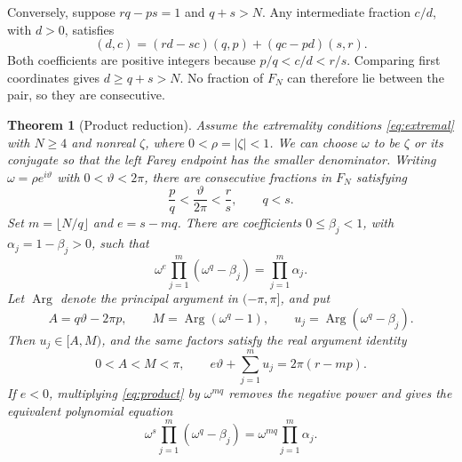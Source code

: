 \documentclass[11pt,a4paper]{article}
\DeclareMathOperator{\Arg}{Arg}
\newtheorem{theorem}{Theorem}[section]
\theoremstyle{definition}
\theoremstyle{remark}
\numberwithin{equation}{section}
\begin{document}
Conversely, suppose $rq-ps=1$ and $q+s>N$. Any intermediate fraction $c/d$, with $d>0$, satisfies
\[
 (d,c)=(rd-sc)(q,p)+(qc-pd)(s,r).
\]
Both coefficients are positive integers because $p/q<c/d<r/s$. Comparing first coordinates gives $d\ge q+s>N$. No fraction of $F_N$ can therefore lie between the pair, so they are consecutive.

\begin{theorem}[Product reduction]\label{thm:product}
Assume the extremality conditions \eqref{eq:extremal} with $N\ge4$ and nonreal $\zeta$, where $0<\rho=|\zeta|<1$. We can choose $\omega$ to be $\zeta$ or its conjugate so that the left Farey endpoint has the smaller denominator. Writing $\omega=\rho e^{i\vartheta}$ with $0<\vartheta<2\pi$, there are consecutive fractions in $F_N$ satisfying
\[
 \frac pq<\frac{\vartheta}{2\pi}<\frac rs,\qquad q<s.
\]
Set $m=\lfloor N/q\rfloor$ and $e=s-mq$. There are coefficients $0\le\beta_j<1$, with $\alpha_j=1-\beta_j>0$, such that
\begin{equation}\label{eq:product}
 \omega^e\prod_{j=1}^m(\omega^q-\beta_j)=\prod_{j=1}^m\alpha_j.
\end{equation}
Let $\Arg$ denote the principal argument in $(-\pi,\pi]$, and put
\[
 A=q\vartheta-2\pi p,\qquad M=\Arg(\omega^q-1),
 \qquad u_j=\Arg(\omega^q-\beta_j).
\]
Then $u_j\in[A,M)$, and the same factors satisfy the real argument identity
\begin{equation}\label{eq:product-phase}
 0<A<M<\pi,\qquad
 e\vartheta+\sum_{j=1}^m u_j=2\pi(r-mp).
\end{equation}
If $e<0$, multiplying \eqref{eq:product} by $\omega^{mq}$ removes the negative power and gives the equivalent polynomial equation
\[
 \omega^s\prod_{j=1}^m(\omega^q-\beta_j)
       =\omega^{mq}\prod_{j=1}^m\alpha_j.
\]
\end{theorem}
\end{document}
